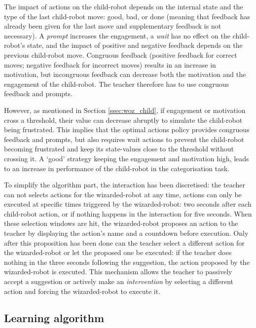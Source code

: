 The impact of actions on the child-robot depends on the internal state and the type of the last child-robot move: good, bad, or done (meaning that feedback has already been given for the last move and supplementary feedback is not necessary). A \textit{prompt} increases the engagement, a \textit{wait} has no effect on the child-robot's state, and the impact of positive and negative feedback depends on the previous child-robot move. Congruous feedback (positive feedback for correct moves; negative feedback for incorrect moves) results in an increase in motivation, but incongruous feedback can decrease both the motivation and the engagement of the child-robot. The teacher therefore has to use congruous feedback and prompts.

However, as mentioned in Section \ref{ssec:woz_child}, if engagement or motivation cross a threshold, their value can decrease abruptly to simulate the child-robot being frustrated. This implies that the optimal actions policy provides congruous feedback and prompts, but also requires wait actions to prevent the child-robot becoming frustrated and keep its state-values close to the threshold without crossing it. A `good' strategy keeping the engagement and motivation high, leads to an increase in performance of the child-robot in the categorisation task.

To simplify the algorithm part, the interaction has been discretised: the teacher can not selects actions for the wizarded-robot at any time, actions can only be executed at specific times triggered by the wizarded-robot: two seconds after each child-robot action, or if nothing happens in the interaction for five seconds. When these selection windows are hit, the wizarded-robot proposes an action to the teacher by displaying the action's name and a countdown before execution. Only after this proposition has been done can the teacher select a different action for the wizarded-robot or let the proposed one be executed: if the teacher does nothing in the three seconds following the suggestion, the action proposed by the wizarded-robot is executed. This mechanism allows the teacher to passively accept a suggestion or actively make an \emph{intervention} by selecting a different action and forcing the wizarded-robot to execute it.

\subsection{Learning algorithm}

